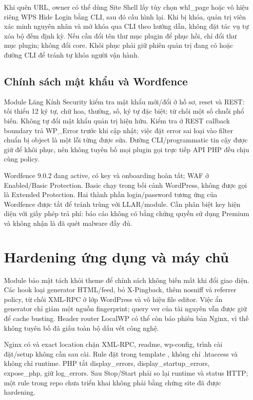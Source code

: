 Khi quên URL, owner có thể dùng Site Shell lấy tùy chọn whl\_page hoặc vô hiệu riêng WPS Hide Login bằng CLI, sau đó cấu hình lại. Khi bị khóa, quản trị viên xác minh nguyên nhân và mở khóa qua CLI theo hướng dẫn, không đặt tác vụ tự xóa bộ đếm định kỳ. Nếu cần đổi tên thư mục plugin để phục hồi, chỉ đổi thư mục plugin; không đổi core. Khôi phục phải giữ phiên quản trị đang có hoặc đường CLI để tránh tự khóa người vận hành.

\subsection{Chính sách mật khẩu và Wordfence}
Module Lăng Kính Security kiểm tra mật khẩu mới/đổi ở hồ sơ, reset và REST: tối thiểu 12 ký tự, chữ hoa, thường, số, ký tự đặc biệt; từ chối một số chuỗi phổ biến. Không tự đổi mật khẩu quản trị hiện hữu. Kiểm tra ở REST callback boundary trả WP\_Error trước khi cập nhật; việc đặt error sai loại vào filter chuẩn bị object là một lỗi từng được sửa. Đường CLI/programmatic tin cậy được giữ để khôi phục, nên không tuyên bố mọi plugin gọi trực tiếp API PHP đều chịu cùng policy.

Wordfence 9.0.2 đang active, có key và onboarding hoàn tất; WAF ở Enabled/Basic Protection. Basic chạy trong bối cảnh WordPress, không được gọi là Extended Protection. Hai thành phần login/password tương ứng của Wordfence được tắt để tránh trùng với LLAR/module. Cần phân biệt key hiện diện với giấy phép trả phí: báo cáo không có bằng chứng quyền sử dụng Premium và không nhận là đã quét malware đầy đủ.\cite{wordfence}

\section{Hardening ứng dụng và máy chủ}
Module bảo mật tách khỏi theme để chính sách không biến mất khi đổi giao diện. Các hook loại generator HTML/feed, bỏ X-Pingback, thêm nosniff và referrer policy, từ chối XML-RPC ở lớp WordPress và vô hiệu file editor. Việc ẩn generator chỉ giảm một nguồn fingerprint; query ver của tài nguyên vẫn được giữ để cache busting. Header router LocalWP có thể còn báo phiên bản Nginx, vì thế không tuyên bố đã giấu toàn bộ dấu vết công nghệ.

Nginx có  và exact location chặn XML-RPC, readme, wp-config, trình cài đặt/setup không cần sau cài. Rule đặt trong template , không chỉ .htaccess và không chỉ runtime. PHP tắt display\_errors, display\_startup\_errors, expose\_php, giữ log\_errors. Sau Stop/Start phải so lại runtime và status HTTP; một rule trong repo chưa triển khai không phải bằng chứng site đã được hardening.

